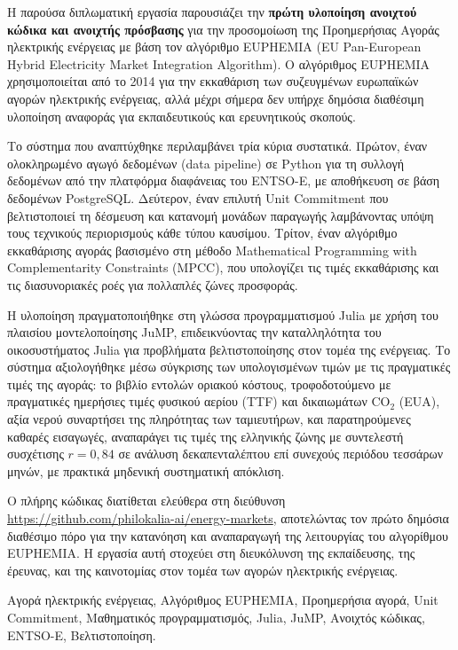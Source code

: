\documentclass[diploma]{softlab-thesis}
\begin{document}
\begin{abstractgr}%
Η παρούσα διπλωματική εργασία παρουσιάζει την \textbf{πρώτη υλοποίηση ανοιχτού κώδικα και ανοιχτής πρόσβασης} για την προσομοίωση της Προημερήσιας Αγοράς ηλεκτρικής ενέργειας με βάση τον αλγόριθμο EUPHEMIA (EU Pan-European Hybrid Electricity Market Integration Algorithm). Ο αλγόριθμος EUPHEMIA χρησιμοποιείται από το 2014 για την εκκαθάριση των συζευγμένων ευρωπαϊκών αγορών ηλεκτρικής ενέργειας, αλλά μέχρι σήμερα δεν υπήρχε δημόσια διαθέσιμη υλοποίηση αναφοράς για εκπαιδευτικούς και ερευνητικούς σκοπούς.

Το σύστημα που αναπτύχθηκε περιλαμβάνει τρία κύρια συστατικά. Πρώτον, έναν ολοκληρωμένο αγωγό δεδομένων (data pipeline) σε Python για τη συλλογή δεδομένων από την πλατφόρμα διαφάνειας του ENTSO-E, με αποθήκευση σε βάση δεδομένων PostgreSQL. Δεύτερον, έναν επιλυτή Unit Commitment που βελτιστοποιεί τη δέσμευση και κατανομή μονάδων παραγωγής λαμβάνοντας υπόψη τους τεχνικούς περιορισμούς κάθε τύπου καυσίμου. Τρίτον, έναν αλγόριθμο εκκαθάρισης αγοράς βασισμένο στη μέθοδο Mathematical Programming with Complementarity Constraints (MPCC), που υπολογίζει τις τιμές εκκαθάρισης και τις διασυνοριακές ροές για πολλαπλές ζώνες προσφοράς.

Η υλοποίηση πραγματοποιήθηκε στη γλώσσα προγραμματισμού Julia με χρήση του πλαισίου μοντελοποίησης JuMP, επιδεικνύοντας την καταλληλότητα του οικοσυστήματος Julia για προβλήματα βελτιστοποίησης στον τομέα της ενέργειας. Το σύστημα αξιολογήθηκε μέσω σύγκρισης των υπολογισμένων τιμών με τις πραγματικές τιμές της αγοράς: το βιβλίο εντολών οριακού κόστους, τροφοδοτούμενο με πραγματικές ημερήσιες τιμές φυσικού αερίου (TTF) και δικαιωμάτων CO$_2$ (EUA), αξία νερού συναρτήσει της πληρότητας των ταμιευτήρων, και παρατηρούμενες καθαρές εισαγωγές, αναπαράγει τις τιμές της ελληνικής ζώνης με συντελεστή συσχέτισης $r = 0{,}84$ σε ανάλυση δεκαπενταλέπτου επί συνεχούς περιόδου τεσσάρων μηνών, με πρακτικά μηδενική συστηματική απόκλιση.

Ο πλήρης κώδικας διατίθεται ελεύθερα στη διεύθυνση \url{https://github.com/philokalia-ai/energy-markets}, αποτελώντας τον πρώτο δημόσια διαθέσιμο πόρο για την κατανόηση και αναπαραγωγή της λειτουργίας του αλγορίθμου EUPHEMIA. Η εργασία αυτή στοχεύει στη διευκόλυνση της εκπαίδευσης, της έρευνας, και της καινοτομίας στον τομέα των αγορών ηλεκτρικής ενέργειας.
  \begin{keywordsgr}
    Αγορά ηλεκτρικής ενέργειας,
    Αλγόριθμος EUPHEMIA,
    Προημερήσια αγορά,
    Unit Commitment,
    Μαθηματικός προγραμματισμός,
    Julia,
    JuMP,
    Ανοιχτός κώδικας,
    ENTSO-E,
    Βελτιστοποίηση.
  \end{keywordsgr}
\end{abstractgr}
\end{document}
